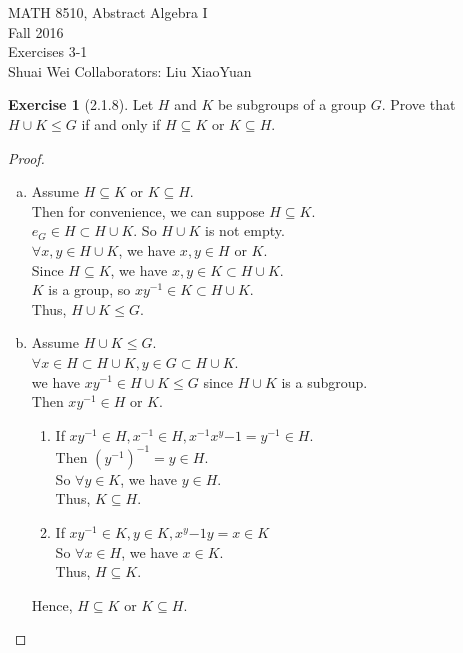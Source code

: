 \documentclass{amsart}
\theoremstyle{plain}
\theoremstyle{definition}
\newtheorem{exer}[lem]{Exercise}
\begin{document}
\noindent MATH 8510, Abstract Algebra I \\
Fall 2016\\
Exercises 3-1\\
Shuai Wei
Collaborators: Liu XiaoYuan
\

%
%

\begin{exer}[2.1.8]
Let $H$ and $K$ be subgroups of a group $G$.
Prove that $H\cup K\leq G$ if and only if $H\subseteq K$ or $K\subseteq H$.

\begin{proof}
	\begin{enumerate}[(a)]
	\item 
		Assume $H\subseteq K$ or $K\subseteq H$.\\
		Then for convenience, we can suppose $H\subseteq K$. \\
		$e_G \in H \subset H \cup K$. So $H\cup K$ is not empty. \\
		$\forall x,y\in H \cup K$, we have $x, y \in H$ or $K$.\\
		Since $H \subseteq K$, we have $x,y \in K \subset H\cup K$.\\
		$K$ is a group, so $xy^{-1} \in K \subset H\cup K$.\\
		Thus, $H\cup K \leq G$.
	\item 
		Assume $H\cup K\leq G$. \\
		$\forall x \in H \subset H\cup K , y \in G \subset H\cup K$.\\
		we have $xy^{-1} \in H\cup K\leq G$ since $H\cup K$ is a subgroup. \\
		Then $xy^{-1}\in H$ or $K$.
		\begin{enumerate}[(1)]
			\item If $xy^{-1} \in H, x^{-1} \in H , x^{-1}x^y{-1} = y^{-1} \in H$. \\
				Then $(y^{-1})^{-1} = y\in H$.\\
				So $\forall y \in K$, we have $y \in H$.\\
				Thus, $K \subseteq H$.
			\item If $xy^{-1} \in K, y \in K, x^y{-1}y = x \in K$\\
				So $\forall x \in H$, we have $x \in K$.\\
				Thus, $H \subseteq K$.
		\end{enumerate}
		Hence, $H\subseteq K$ or $K\subseteq H$.
	\end{enumerate}
\end{proof}



\end{exer}
\end{document}
